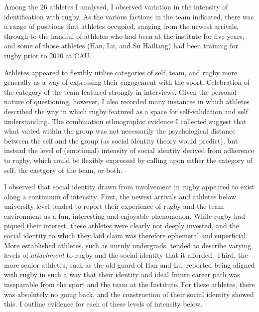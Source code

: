 \begin{CJK}{UTF8}{gbsn}
Among the 26 athletes I analysed, I observed variation in the intensity of identification with rugby.  As the various factions in the team indicated, there was a range of positions that athletes occupied, ranging from the newest arrivals, through to the handful of athletes who had been at the institute for five years, and some of those athletes (Han, Lu, and Su Hailiang) had been training for rugby prior to 2010 at CAU.

Athletes appeared to flexibly utilise categories of self, team, and rugby more generally as a way of expressing their engagement with the sport.  Celebration of the category of the team featured strongly in interviews.  Given the personal nature of questioning, however, I also recorded many instances in which athletes described the way in which rugby featured as a space for self-validation and self understanding. The combination ethnographic evidence I collected suggest that what varied within the group was not necessarily the psychological distance between the self and the group (as social identity theory would predict), but instead the level of (emotional) intensity of social identity derived from adherence to rugby, which could be flexibly expressed by calling upon either the category of self, the caetgory of the team, or both.

I observed that social identity drawn from involvement in rugby appeared to exist along a continuum of intensity. First, the newest arrivals and athletes below university level tended to report their experience of rugby and the team environment as a fun, interesting and enjoyable phenomenon.  While rugby had piqued their interest, these athletes were clearly not deeply invested, and the social identity to which they laid claim was therefore ephemeral and superficial.  More established athletes, such as unruly undergrads, tended to describe varying levels of \textit{attachment} to rugby and the social identity that it afforded.  Third, the more senior athletes, such as the old guard of Han and Lu, reported being aligned with rugby in such a way that their identity and ideal future career path was inseparable from the sport and the team at the Institute.  For these athletes, there was absolutely no going back, and the construction of their social identity showed this.  I outline evidence for each of these levels of intensity below.





\end{CJK}
